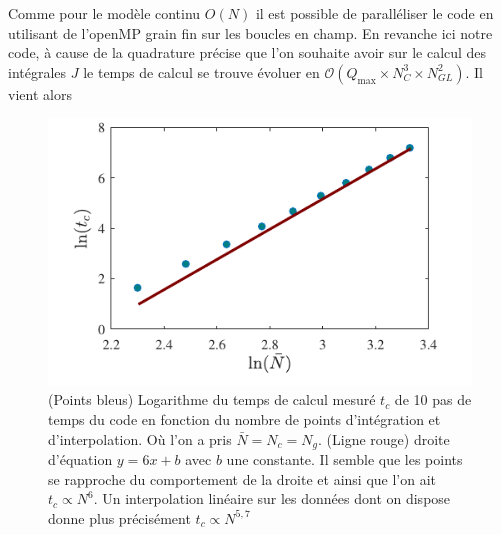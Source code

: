 \documentclass[10pt]{article}
\begin{document}
\begin{multicols}{2}
Comme pour le modèle continu $O(N)$ il est possible de paralléliser le code en utilisant de l'openMP \cite{} grain fin sur les boucles en champ. En revanche ici notre code, à cause de la quadrature précise que l'on souhaite avoir sur le calcul des intégrales $J$ le temps de calcul se trouve évoluer en $\mathcal{O}( Q_\text{max} \times N_C^3 \times N_{GL}^2)$. Il vient alors 
\begin{figure}[H]
\begin{center}
	\includegraphics[width=0.95\columnwidth]{ComplexiteTemps.pdf}
\end{center}
\caption{(Points bleus) Logarithme du temps de calcul mesuré $t_c$ de 10 pas de temps du code en fonction du nombre de points d'intégration et d'interpolation. Où l'on a pris $\bar{N} = N_c = N_g$. (Ligne rouge) droite d'équation $y=6x+b$ avec $b$ une constante. Il semble que les points se rapproche du comportement de la droite et ainsi que l'on ait $t_c \propto N^6$. Un interpolation linéaire sur les données dont on dispose donne plus précisément $t_c \propto N^{5,7} $   }
\end{figure}

\pagebreak





\end{multicols}


\pagebreak

\appendix
\end{document}
